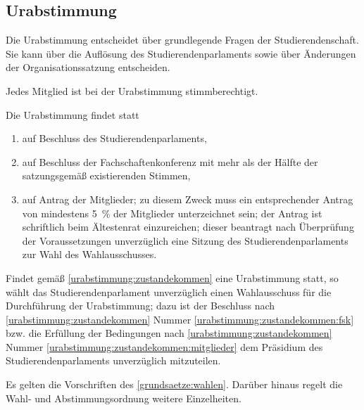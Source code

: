 \begin{contract}
%
%

\parnumberfalse \section{Urabstimmung}\label{urabstimmung} \parnumbertrue

\parnumberfalse Die Urabstimmung entscheidet über grundlegende Fragen der Studierendenschaft. Sie kann über die Auflösung des Studierendenparlaments sowie über Änderungen der Organisationssatzung entscheiden.\parnumbertrue

\parnumberfalse Jedes Mitglied ist bei der Urabstimmung stimmberechtigt.\parnumbertrue

\label{urabstimmung:zustandekommen}
\parnumberfalse Die Urabstimmung findet statt
\begin{enumerate}
\item auf Beschluss des Studierendenparlaments,
\item auf Beschluss der Fachschaftenkonferenz mit mehr als der Hälfte der satzungsgemäß existierenden Stimmen, \label{urabstimmung:zustandekommen:fsk}
\item auf Antrag der Mitglieder; zu diesem Zweck muss ein entsprechender Antrag von mindestens 5~\% der Mitglieder unterzeichnet sein; der Antrag ist schriftlich beim Ältestenrat einzureichen; dieser beantragt nach Überprüfung der Voraussetzungen unverzüglich eine Sitzung des Studierendenparlaments zur Wahl des Wahlausschusses. \label{urabstimmung:zustandekommen:mitglieder}
\end{enumerate} \parnumbertrue

\label{urabstimmung:orga}

Findet gemäß \ref{urabstimmung:zustandekommen} eine Urabstimmung statt, so wählt das Studierendenparlament unverzüglich einen Wahlausschuss für die Durchführung der Urabstimmung; dazu ist der Beschluss nach \ref{urabstimmung:zustandekommen} Nummer \ref{urabstimmung:zustandekommen:fsk} bzw. die Erfüllung  der Bedingungen nach \ref{urabstimmung:zustandekommen}  Nummer \ref{urabstimmung:zustandekommen:mitglieder} dem Präsidium des Studierendenparlaments unverzüglich mitzuteilen.

Es gelten die Vorschriften des \ref{grundsaetze:wahlen}. Darüber hinaus regelt die Wahl- und Abstimmungsordnung weitere Einzelheiten.




\end{contract}
